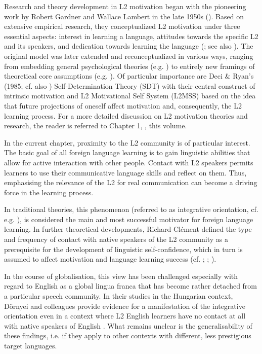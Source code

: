 \documentclass[output=paper]{langsci/langscibook}
\begin{document}
Research and theory development in L2 motivation began with the pioneering work by Robert Gardner and Wallace Lambert in the late 1950s (\citealt{GardnerLambert1959}). Based on extensive empirical research, they conceptualized L2 motivation under three essential aspects: interest in learning a language, attitudes towards the specific L2 and its speakers, and dedication towards learning the language (\citealt{GardnerLambert1959}; see also \citealt{Gardner1985}). The original model was later extended and reconceptualized in various ways, ranging from embedding general psychological theories (e.g. \citealt{Noels2001}) to entirely new framings of theoretical core assumptions (e.g. \citealt{Doernyei2005}). Of particular importance are Deci \& Ryan’s (1985; cf. also \citealt{RyanDeci2002}) Self-Determination Theory (SDT) with their central construct of intrinsic motivation and  L2 Motivational Self System (L2MSS) based on the idea that future projections of oneself affect motivation and, consequently, the L2 learning process. For a more detailed discussion on L2 motivation theories and research, the reader is referred to Chapter 1, , this volume.

In the current chapter, proximity to the L2 community is of particular interest. The basic goal of all foreign language learning is to gain linguistic abilities that allow for active interaction with other people. Contact with L2 speakers permits learners to use their communicative language skills and reflect on them. Thus, emphasising the relevance of the L2 for real communication can become a driving force in the learning process.

In traditional theories, this phenomenon (referred to as integrative orientation, cf. e.g. \citealt{Gardner1985}), is considered the main and most successful motivator for foreign language learning. In further theoretical developments, Richard Clément defined the type and frequency of contact with native speakers of the L2 community as a prerequisite for the development of linguistic self-confidence, which in turn is assumed to affect motivation and language learning success (cf. \citealt{Clement1980}; \citealt{ClementKruidenier1985}; \citealt{SampasivamClement2014}). 

In the course of globalisation, this view has been challenged especially with regard to English as a global lingua franca that has become rather detached from a particular speech community. In their studies in the Hungarian context, Dörnyei and colleagues provide evidence for a manifestation of the integrative orientation even in a context where L2 English learners have no contact at all with native speakers of English \citep{DoernyeiEtAl2006}. What remains unclear is the generalisability of these findings, i.e. if they apply to other contexts with different, less prestigious target languages.
\end{document}
